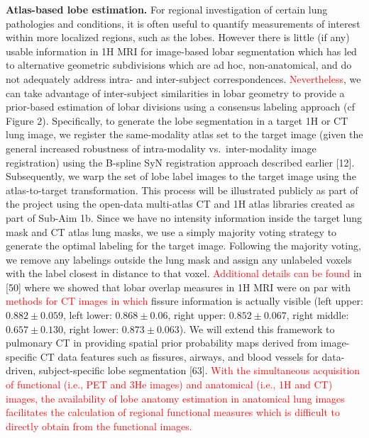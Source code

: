 \documentclass[11pt,]{article}
\begin{document}


\textbf{Atlas-based lobe estimation.} For regional investigation of
certain lung pathologies and conditions, it is often useful to quantify
measurements of interest within more localized regions, such as the
lobes. However there is little (if any) usable information in 1H MRI for
image-based lobar segmentation which has led to alternative geometric
subdivisions which are ad hoc, non-anatomical, and do not adequately
address intra- and inter-subject correspondences.
\textcolor{red}{Nevertheless}, we can take advantage of inter-subject
similarities in lobar geometry to provide a prior-based estimation of
lobar divisions using a consensus labeling approach (cf Figure 2).
Specifically, to generate the lobe segmentation in a target 1H or CT
lung image, we register the same-modality atlas set to the target image
(given the general increased robustness of intra-modality
vs.~inter-modality image registration) using the B-spline SyN
registration approach described earlier {[}12{]}. Subsequently, we warp
the set of lobe label images to the target image using the
atlas-to-target transformation. This process will be illustrated
publicly as part of the project using the open-data multi-atlas CT and
1H atlas libraries created as part of Sub-Aim 1b. Since we have no
intensity information inside the target lung mask and CT atlas lung
masks, we use a simply majority voting strategy to generate the optimal
labeling for the target image. Following the majority voting, we remove
any labelings outside the lung mask and assign any unlabeled voxels with
the label closest in distance to that voxel.
\textcolor{red}{Additional details can be found} in {[}50{]} where we
showed that lobar overlap measures in 1H MRI were on par with
\textcolor{red}{methods for CT images  in which} fissure information is
actually visible (left upper: \(0.882 \pm 0.059\), left lower:
\(0.868 \pm 0.06\), right upper: \(0.852 \pm 0.067\), right middle:
\(0.657 \pm 0.130\), right lower: \(0.873 \pm 0.063\)). We will extend
this framework to pulmonary CT in providing spatial prior probability
maps derived from image-specific CT data features such as fissures,
airways, and blood vessels for data-driven, subject-specific lobe
segmentation {[}63{]}.
\textcolor{red}{With the simultaneous acquisition of functional (i.e., PET and 3He images)
and anatomical (i.e., 1H and CT) images, the availability of lobe anatomy estimation
in anatomical lung images facilitates the calculation of regional functional measures which
is difficult to directly obtain from the functional images.}
\end{document}
